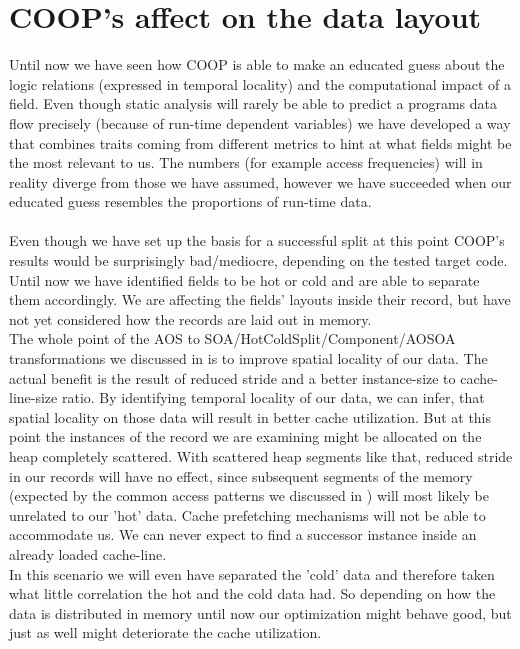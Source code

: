 \section{COOP's affect on the data layout}\label{affect_on_data_layout}
Until now we have seen how COOP is able to make an educated guess about the logic relations (expressed in temporal locality) and the computational impact of a field. Even though static analysis will rarely be able to predict a programs data flow precisely (because of run-time dependent variables) we have developed a way that combines traits coming from different metrics to hint at what fields might be the most relevant to us. The numbers (for example access frequencies) will in reality diverge from those we have assumed, however we have succeeded when our educated guess resembles the proportions of run-time data.\\\\
Even though we have set up the basis for a successful split at this point COOP's results would be surprisingly bad/mediocre, depending on the tested target code. Until now we have identified fields to be hot or cold and are able to separate them accordingly. We are affecting the fields' layouts inside their record, but have not yet considered how the records are laid out in memory.\\
The whole point of the AOS to SOA/HotColdSplit/Component/AOSOA transformations we discussed in  is to improve spatial locality of our data. The actual benefit is the result of reduced stride and a better instance-size to cache-line-size ratio. By identifying temporal locality of our data, we can infer, that spatial locality on those data will result in better cache utilization. But at this point the instances of the record we are examining might be allocated on the heap completely scattered. With scattered heap segments like that, reduced stride in our records will have no effect, since subsequent segments of the memory (expected by the common access patterns we discussed in ) will most likely be unrelated to our 'hot' data. Cache prefetching mechanisms will not be able to accommodate us. We can never expect to find a successor instance inside an already loaded cache-line.\\ 
In this scenario we will even have separated the 'cold' data and therefore taken what little correlation the hot and the cold data had. So depending on how the data is distributed in memory until now our optimization might behave good, but just as well might deteriorate the cache utilization.\\\\
